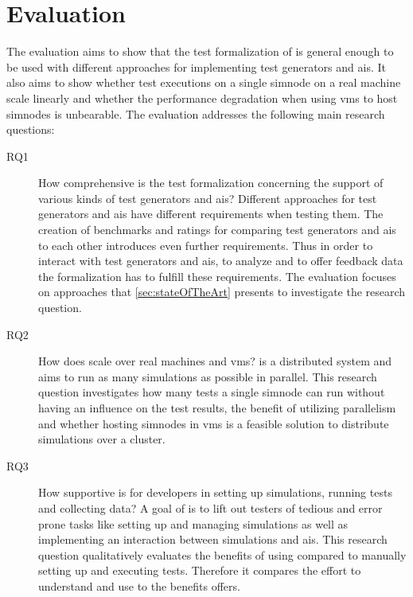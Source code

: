 \section{Evaluation}\label{sec:evaluation}
The evaluation aims to show that the test formalization of \drivebuild{} is general enough to be used with different approaches for implementing test generators and \glspl{ai}.
It also aims to show whether test executions on a single \gls{simnode} on a real machine scale linearly and whether the performance degradation when using \glspl{vm} to host \glspl{simnode} is unbearable.
The evaluation addresses the following main research questions:
\begin{description}
    \item[RQ1] How comprehensive is the test formalization concerning the support of various kinds of test generators and \glspl{ai}?
        Different approaches for test generators and \glspl{ai} have different requirements when testing them.
        The creation of benchmarks and ratings for comparing test generators and \glspl{ai} to each other introduces even further requirements.
        Thus in order to interact with test generators and \glspl{ai}, to analyze and to offer feedback data the formalization has to fulfill these requirements.
        The evaluation focuses on approaches that \cref{sec:stateOfTheArt} presents to investigate the research question.
    \item[RQ2] How does \drivebuild{} scale over real machines and \glspl{vm}?
        \drivebuild{} is a distributed system and aims to run as many simulations as possible in parallel.
        This research question investigates how many tests a single \gls{simnode} can run without having an influence on the test results, the benefit of utilizing parallelism and whether hosting \glspl{simnode} in \glspl{vm} is a feasible solution to distribute simulations over a cluster.
    \item[RQ3] How supportive is \drivebuild{} for developers in setting up simulations, running tests and collecting data?
        A goal of \drivebuild{} is to lift out testers of tedious and error prone tasks like setting up and managing simulations as well as implementing an interaction between simulations and \glspl{ai}.
        This research question qualitatively evaluates the benefits of using \drivebuild{} compared to manually setting up and executing tests.
        Therefore it compares the effort to understand and use \drivebuild{} to the benefits \drivebuild{} offers.
\end{description}
